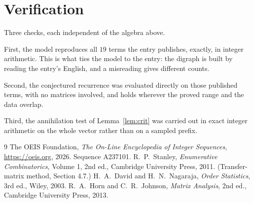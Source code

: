 \documentclass[11pt,a4paper]{article}
\theoremstyle{plain}
\theoremstyle{definition}
\begin{document}
\section{Verification}

Three checks, each independent of the algebra above.

First, the model reproduces all $19$ terms the entry publishes, exactly, in integer
arithmetic. This is what ties the model to the entry: the digraph is built by reading the
entry's English, and a misreading gives different counts.

Second, the conjectured recurrence was evaluated directly on those published terms, with no
matrices involved, and holds wherever the proved range and the data overlap.

Third, the annihilation test of Lemma~\ref{lem:crit} was carried out in exact integer
arithmetic on the whole vector rather than on a sampled prefix.

\begin{thebibliography}{9}
 The OEIS Foundation, \emph{The On-Line Encyclopedia of Integer
Sequences}, \url{https://oeis.org}, 2026. Sequence A237101.
 R.~P.~Stanley, \emph{Enumerative Combinatorics}, Volume 1, 2nd ed.,
Cambridge University Press, 2011. (Transfer-matrix method, Section 4.7.)
 H.~A.~David and H.~N.~Nagaraja, \emph{Order Statistics}, 3rd ed., Wiley,
2003.
 R.~A.~Horn and C.~R.~Johnson, \emph{Matrix Analysis}, 2nd ed., Cambridge
University Press, 2013.
\end{thebibliography}
\end{document}
